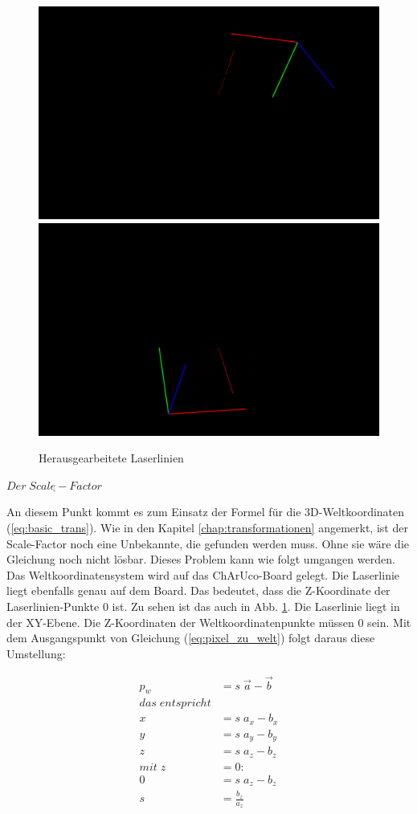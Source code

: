 		\begin{figure}[h]
			\centering
			\includegraphics[width=0.49\linewidth]{img/hauptteil/ext-calib/laserline_primary.png}
			\includegraphics[width=0.49\linewidth]{img/hauptteil/ext-calib/laserline_secondary.png}
			\caption{Herausgearbeitete Laserlinien}
			\label{fig:ext-calib-laserlines}
		\end{figure}
	
		$\underline{Der \; Scale-Factor}$
		
		An diesem Punkt kommt es zum Einsatz der Formel für die 3D-Weltkoordinaten (\ref{eq:basic_trans}). Wie in den Kapitel \ref{chap:transformationen} angemerkt, ist der Scale-Factor noch eine Unbekannte, die gefunden werden muss. Ohne sie wäre die Gleichung noch nicht lösbar. Dieses Problem kann wie folgt umgangen werden. Das Weltkoordinatensystem wird auf das ChArUco-Board gelegt. Die Laserlinie liegt ebenfalls genau auf dem Board. Das bedeutet, dass die Z-Koordinate der Laserlinien-Punkte 0 ist. Zu sehen ist das auch in Abb. \ref{fig:ext-calib-laserlines}. Die Laserlinie liegt in der XY-Ebene. Die Z-Koordinaten der Weltkoordinatenpunkte müssen 0 sein. Mit dem Ausgangspunkt von Gleichung (\ref{eq:pixel_zu_welt}) folgt daraus diese Umstellung:
		
		\begin{equation}
			\begin{aligned}
				p_w &= s \; \vec{a} - \vec{b} \\
				das \; entspricht \\
				x &= s \; a_x - b_x \\
				y &= s \; a_y - b_y \\
				z &= s \; a_z - b_z \\
				mit \; z &= 0: \\
				0 &= s \; a_z - b_z \\
				s &= \frac{b_z}{a_z}
			\end{aligned}
		\end{equation}
		
